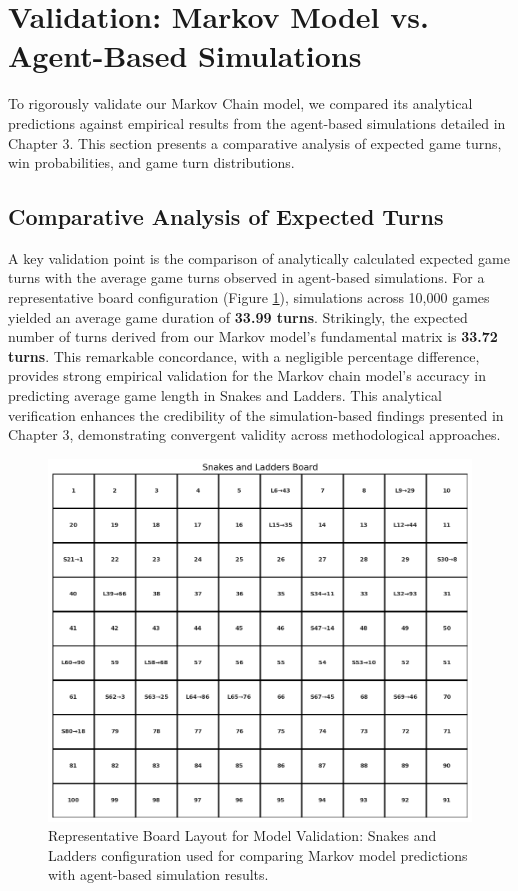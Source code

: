 \section{Validation: Markov Model vs. Agent-Based Simulations}
To rigorously validate our Markov Chain model, we compared its analytical predictions against empirical results from the agent-based simulations detailed in Chapter 3. This section presents a comparative analysis of expected game turns, win probabilities, and game turn distributions.

\subsection{Comparative Analysis of Expected Turns}

A key validation point is the comparison of analytically calculated expected game turns with the average game turns observed in agent-based simulations. For a representative board configuration (Figure \ref{fig:boardlayout}), simulations across 10,000 games yielded an average game duration of \textbf{33.99 turns}. Strikingly, the expected number of turns derived from our Markov model's fundamental matrix is \textbf{33.72 turns}. This remarkable concordance, with a negligible percentage difference, provides strong empirical validation for the Markov chain model's accuracy in predicting average game length in Snakes and Ladders. This analytical verification enhances the credibility of the simulation-based findings presented in Chapter 3, demonstrating convergent validity across methodological approaches.

\begin{figure}
	\centering
	\includegraphics[width=0.7\linewidth]{"../Markov Modelling/Data/BoardLayout"}
	\caption{Representative Board Layout for Model Validation: Snakes and Ladders configuration used for comparing Markov model predictions with agent-based simulation results.}
	\label{fig:boardlayout}
\end{figure}

